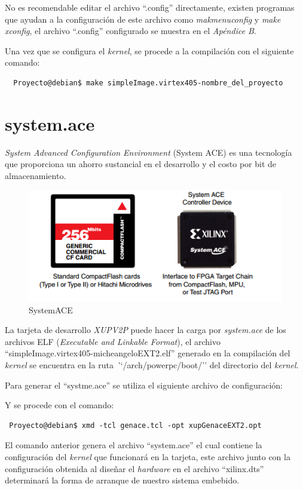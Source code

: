 No es  recomendable editar el archivo ``.config'' directamente, existen
programas que ayudan a la configuración de este archivo como
\emph{makmenuconfig} y \emph{make xconfig}, el archivo ``.config''
configurado se muestra en el \emph{Apéndice B}.

Una vez que se configura el \emph{kernel}, se procede a la compilación con el
siguiente comando:
\begin{verbatim}
  Proyecto@debian$ make simpleImage.virtex405-nombre_del_proyecto
\end{verbatim}


\section{system.ace}


\emph{System Advanced Configuration Environment} (System ACE) es una tecnología
que proporciona un ahorro sustancial en el desarrollo y el costo por bit de
almacenamiento.

\begin{figure}[ht]
 \centering
 \includegraphics[scale=.70]{./figuras/SystemACE.png}
 \caption{SystemACE}
 \label{SystemACE}
\end{figure}

La tarjeta de desarrollo \emph{XUPV2P} puede hacer la carga por
\emph{system.ace} de los archivos ELF (\emph{Executable and Linkable Format}),
el archivo ``simpleImage.virtex405-micheangeloEXT2.elf'' generado en la
compilación del \emph{kernel} se encuentra en la ruta
\emph``/arch/powerpc/boot/'' del directorio del \emph{kernel}.

Para generar el ``systme.ace'' se utiliza el siguiente archivo de configuración:



Y se procede con el comando:
\begin{verbatim}
 Proyecto@debian$ xmd -tcl genace.tcl -opt xupGenaceEXT2.opt
\end{verbatim}

El comando anterior genera el archivo ``system.ace'' el cual contiene la
configuración del \emph{kernel} que funcionará en la tarjeta, este archivo
junto con la configuración obtenida al diseñar el \emph{hardware} en el archivo
``xilinx.dts'' determinará la forma de arranque de nuestro sistema embebido.






